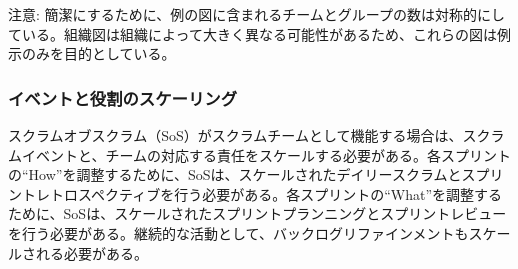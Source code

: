 \documentclass[12pt,a4paper,parskip=full]{scrartcl}
\begin{document}

注意: 簡潔にするために、例の図に含まれるチームとグループの数は対称的にしている。組織図は組織によって大きく異なる可能性があるため、これらの図は例示のみを目的としている。

\subsubsection{イベントと役割のスケーリング}\label{scaling-the-events-and-roles}

スクラムオブスクラム（SoS）がスクラムチームとして機能する場合は、スクラムイベントと、チームの対応する責任をスケールする必要がある。各スプリントの“How”を調整するために、SoSは、スケールされたデイリースクラムとスプリントレトロスペクティブを行う必要がある。各スプリントの“What”を調整するために、SoSは、スケールされたスプリントプランニングとスプリントレビューを行う必要がある。継続的な活動として、バックログリファインメントもスケールされる必要がある。
\end{document}
